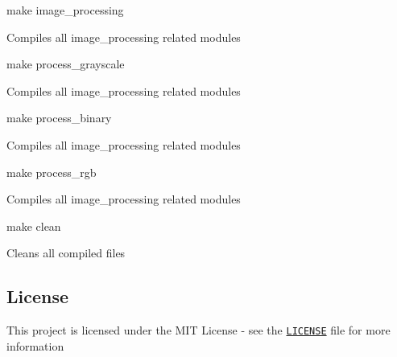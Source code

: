 \begin{DoxyItemize}
\item make image\+\_\+processing
\begin{DoxyItemize}
\item Compiles all image\+\_\+processing related modules
\end{DoxyItemize}
\item make process\+\_\+grayscale
\begin{DoxyItemize}
\item Compiles all image\+\_\+processing related modules
\end{DoxyItemize}
\item make process\+\_\+binary
\begin{DoxyItemize}
\item Compiles all image\+\_\+processing related modules
\end{DoxyItemize}
\item make process\+\_\+rgb
\begin{DoxyItemize}
\item Compiles all image\+\_\+processing related modules
\end{DoxyItemize}
\item make clean
\begin{DoxyItemize}
\item Cleans all compiled files
\end{DoxyItemize}
\end{DoxyItemize}

\subsection*{License}

This project is licensed under the M\+IT License -\/ see the \href{https://github.com/heroufenix/image-processing-using-c/blob/master/LICENSE}{\tt L\+I\+C\+E\+N\+SE} file for more information 